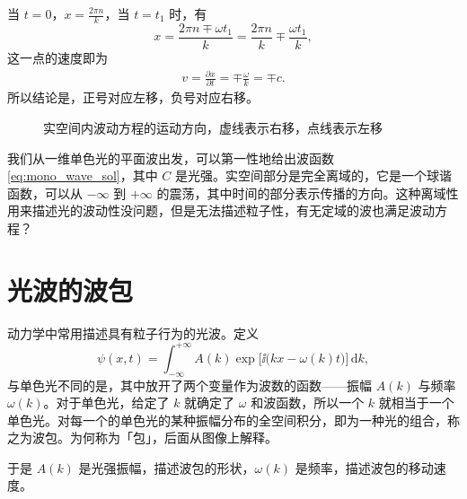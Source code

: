 当 $t = 0$，$x = \frac{2\pi n}{k}$，当 $t = t_1$ 时，有
\begin{equation}
    x = \frac{2\pi n \mp \omega t_1}k = \frac{2\pi n}k \mp \frac{\omega t_1}k,
\end{equation}
这一点的速度即为
\begin{eqnarray}
    v = \frac{\partial x}{\partial t} = \mp\frac{\omega}k = \mp c.
\end{eqnarray}
所以结论是，正号对应左移，负号对应右移。
\begin{figure}\centering
    \caption{实空间内波动方程的运动方向，虚线表示右移，点线表示左移}
\end{figure}

我们从一维单色光的平面波出发，可以第一性地给出波函数 \eqref{eq:mono_wave_sol}，其中 $C$ 是光强。实空间部分是完全离域的，它是一个球谐函数，可以从 $-\infty$ 到 $+\infty$ 的震荡，其中时间的部分表示传播的方向。这种离域性用来描述光的波动性没问题，但是无法描述粒子性，有无定域的波也满足波动方程？

\section{光波的波包}
动力学中常用描述具有粒子行为的光波。定义
\begin{equation}
    \label{eq:wp_def} %
    \psi(x,t) = \int_{- \infty}^{+ \infty} A(k) \exp \big[ \ii \big( k x - \omega(k) t \big) \big] \, \mathrm{d} k,
\end{equation}
与单色光不同的是，其中放开了两个变量作为波数的函数——振幅 $A(k)$ 与频率 $\omega(k)$。对于单色光，给定了 $k$ 就确定了 $\omega$ 和波函数，所以一个 $k$ 就相当于一个单色光。对每一个的单色光的某种振幅分布的全空间积分，即为一种光的组合，称之为波包。为何称为「包」，后面从图像上解释。

于是 $A(k)$ 是光强振幅，描述波包的形状，$\omega(k)$ 是频率，描述波包的移动速度。

